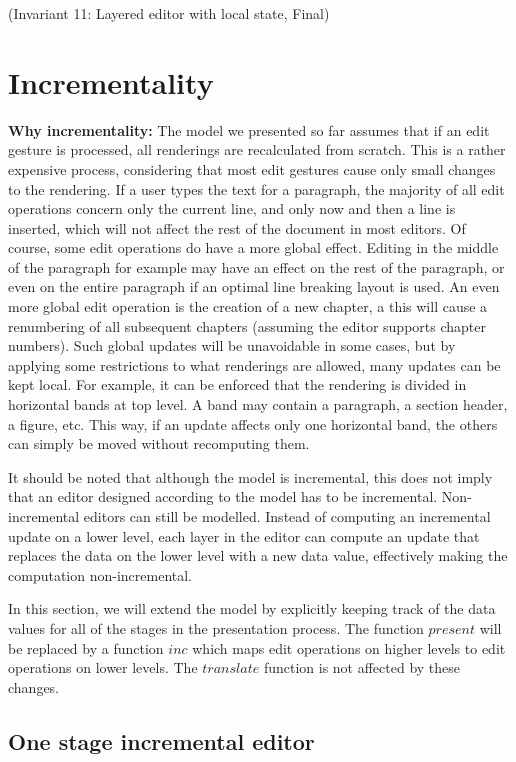 \documentclass[twoside,epsf]{report}
\begin{document}
{\centering (Invariant 11: Layered editor with local state, Final)\\}\vspace{1em}
\section{Incrementality}




{\bf Why incrementality: }The model we presented so far assumes that if an edit gesture is processed, all renderings are recalculated from scratch. This is a rather expensive process, considering that most edit gestures cause only small changes to the rendering. If a user types the text for a paragraph, the majority of all edit operations concern only the current line, and only now and then a line is inserted, which will not affect the rest of the document in most editors. Of course, some edit operations do have a more global effect. Editing in the middle of the paragraph for example may have an effect on the rest of the paragraph, or even on the entire paragraph if an optimal line breaking layout is used. An even more global edit operation is the creation of a new chapter, a this will cause a renumbering of all subsequent chapters (assuming the editor supports chapter numbers). Such global updates will be unavoidable in some cases, but by applying some restrictions to what renderings are allowed, many updates can be kept local. For example, it can be enforced that the rendering is divided in horizontal bands at top level. A band may contain a paragraph, a section header, a figure, etc. This way, if an update affects only one horizontal band, the others can simply be moved without recomputing them.

It should be noted that although the model is incremental, this does not imply that an editor designed according to the model has to be incremental. Non-incremental editors can still be modelled. Instead of computing an incremental update on a lower level, each layer in the editor can compute an update that replaces the data on the lower level with a new data value, effectively making the computation non-incremental. 

In this section, we will extend the model by explicitly keeping track of the data values for all of the stages in the presentation process. The function $present$ will be replaced by a function $inc$ which maps edit operations on higher levels to edit operations on lower levels. The $translate$ function is not affected by these changes.
\subsection{One stage incremental editor	}
\end{document}
